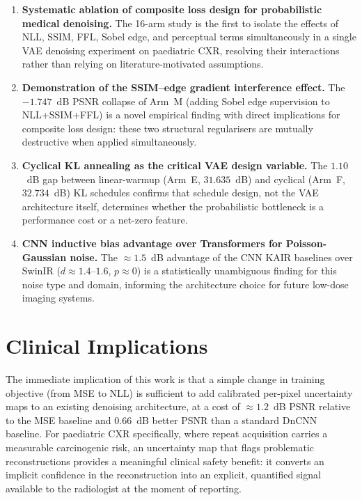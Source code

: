 \documentclass[12pt, a4paper, twoside, openright]{book}
\begin{document}
\begin{enumerate}
  \item \textbf{Systematic ablation of composite loss design for probabilistic medical denoising.} The 16-arm study is the first to isolate the effects of NLL, SSIM, FFL, Sobel edge, and perceptual terms simultaneously in a single VAE denoising experiment on paediatric CXR, resolving their interactions rather than relying on literature-motivated assumptions.

  \item \textbf{Demonstration of the SSIM--edge gradient interference effect.} The $-1.747$~dB PSNR collapse of Arm~M (adding Sobel edge supervision to NLL+SSIM+FFL) is a novel empirical finding with direct implications for composite loss design: these two structural regularisers are mutually destructive when applied simultaneously.

  \item \textbf{Cyclical KL annealing as the critical VAE design variable.} The $1.10$~dB gap between linear-warmup (Arm~E, $31.635$~dB) and cyclical (Arm~F, $32.734$~dB) KL schedules confirms that schedule design, not the VAE architecture itself, determines whether the probabilistic bottleneck is a performance cost or a net-zero feature.

  \item \textbf{CNN inductive bias advantage over Transformers for Poisson-Gaussian noise.} The $\approx 1.5$~dB advantage of the CNN KAIR baselines over SwinIR ($d \approx 1.4$--$1.6$, $p \approx 0$) is a statistically unambiguous finding for this noise type and domain, informing the architecture choice for future low-dose imaging systems.
\end{enumerate}

\section{Clinical Implications}
\label{sec:conc:clinical}

The immediate implication of this work is that a simple change in training objective (from MSE to NLL) is sufficient to add calibrated per-pixel uncertainty maps to an existing denoising architecture, at a cost of $\approx 1.2$~dB PSNR relative to the MSE baseline and $0.66$~dB better PSNR than a standard DnCNN baseline. For paediatric CXR specifically, where repeat acquisition carries a measurable carcinogenic risk, an uncertainty map that flags problematic reconstructions provides a meaningful clinical safety benefit: it converts an implicit confidence in the reconstruction into an explicit, quantified signal available to the radiologist at the moment of reporting.
\end{document}
